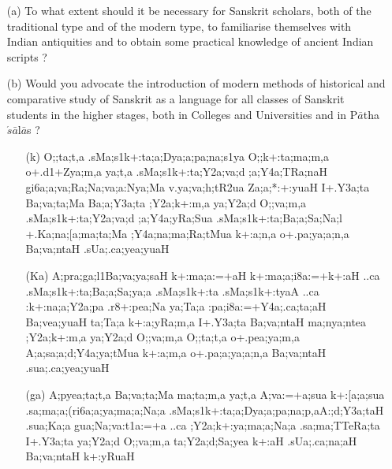 {\begin{itemize}
\begin{itemize}
           \item[(a)] To what extent should it be necessary for Sanskrit scholars, both of the traditional type and of the modern type, to familiarise themselves with Indian antiquities and to obtain some practical knowledge of ancient Indian scripts ?
           
           \item[(b)] Would you advocate the introduction of modern methods of historical and comparative study of Sanskrit as a language for all classes of Sanskrit students in the higher stages, both in Colleges and Universities and in P$\bar{a}$tha$\acute{s}\bar{a}$l$\bar{a}$s ?
           
           \end{itemize}
\end{itemize}
}

\begin{itemize}  
 \item[{\sktf 22}] \begin{itemize}
               
               \item[({\sktf k})] {\sktf O;;ta;t,a
.sMa;s1k+:ta;a;Dya;a;pa;na;s1ya O;;k+:ta;ma;m,a
o+.d1+Zya;m,a\ZF{,} ya;t,a .sMa;s1k+:ta;Y2a;va;d%
;a;Y4a;TRa;naH gi6a;a;va;Ra;Na;va;a:Nya;Ma v.ya;va;h;tR2ua Za;a;*:+:yuaH%
 I+.Y3a;ta Ba;va;ta;Ma Ba;a;Y3a;ta ;Y2a;k+:m,a ya;Y2a;d
O;;va;m,a\ZF{,} .sMa;s1k+:ta;Y2a;va;d%
;a;Y4a;yRa;Sua .sMa;s1k+:ta;Ba;a;Sa;Na;l%
+.Ka;na;[a;ma;ta;Ma ;Y4a;na;ma;Ra;tMua k+:a;n,a o+.pa;ya;a;n,a Ba;va;ntaH
.sUa;.ca;yea;yuaH}
               
               \item[({\sktf Ka})] {\sktf A;pra;ga;l1Ba;va;ya;saH
k+:ma;a:=+aH k+:ma;a;i8a:=+k+:aH ..ca
.sMa;s1k+:ta;Ba;a;Sa;ya;a .sMa;s1k+:ta%
\ZF{-}.sMa;s1k+:tyaA ..ca :k+:na;a;Y2a;pa .r8+:pea;Na ya;Ta;a
:pa;i8a:=+Y4a;.ca;ta;aH Ba;vea;yuaH ta;Ta;a k+:a;yRa;m,a\ZF{,}
I+.Y3a;ta Ba;va;ntaH ma;nya;ntea ;Y2a;k+:m,a ya;Y2a;d
O;;va;m,a\ZF{,} O;;ta;t,a o+.pea;ya;m,a A;a;sa;a;d;Y4a;ya;tMua k+:a;m,a o+.pa;a;ya;a;n,a Ba;va;ntaH .sua;.ca;yea;yuaH}
               
               \item[({\sktf ga})] {\sktf A;pyea;ta;t,a Ba;va;ta;Ma
ma;ta;m,a\ZF{,} ya;t,a A;va:=+a;sua k+:[a;a;sua .sa;ma;a;(ri6a;a;ya;ma;a;Na;a
.sMa;s1k+:ta;a;Dya;a;pa;na;p,aA:;d;Y3a;taH .sua;Ka;a gua;Na;va:t1a:=+a ..ca
;Y2a;k+:ya;ma;a;Na;a .sa;ma;TTeRa;ta I+.Y3a;ta ya;Y2a;d
O;;va;m,a\ZF{,} ta;Y2a;d;Sa;yea k+:aH .sUa;.ca;na;aH
Ba;va;ntaH k+:yRuaH}
 
                \end{itemize}      
                                                                
\end{itemize}

